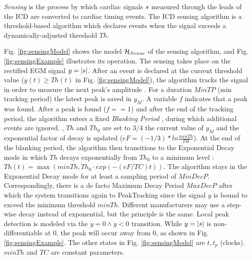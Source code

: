 \emph{Sensing} is the process by which cardiac signals $s$ measured through the leads of the \ac{ICD} are converted to cardiac timing events.
The \ac{ICD} sensing algorithm is a threshold-based algorithm which declares events when the signal exceeds a dynamically-adjusted threshold $Th$.

Fig. \ref{fig:sensingModel} shows the model $\mathcal{H}_{Sense}$ of the sensing algorithm, and Fig. \ref{fig:sensingExample} illustrates its operation. 
The sensing takes place on the rectified \ac{EGM} signal $y = |s|$.
After an event is declared at the current threshold value ($y(t)\geq Th(t)$ in Fig. \ref{fig:sensingModel}), the algorithm tracks the signal in order to measure the next peak's amplitude .
For a duration $MinTP$ (min tracking period) the latest peak is saved in $y_M$.
A variable $f$ indicates that a peak was found.
After a peak is found ($f==1$) and after the end of the tracking period, the algorithm enters a fixed \emph{Blanking Period} , during which additional events are ignored.
, $Th$ and $Th_0$ are set to 3/4 the current value of $y_{M}$ and the exponential factor of decay is updated ($eF=(-1/3)*ln{\frac{minTh}{TH}}$). 
At the end of the blanking period, the algorithm then transitions to the Exponential Decay mode in which $Th$ decays exponentially from $Th_0$ to a minimum level :
$Th(t) = \max(minTh, Th_0\cdot exp(-(eF/TC)t)) $.
The algorithm stays in the Exponential Decay mode for at least a sampling period of $MinDecP$.
Correspondingly, there is a de facto Maximum Decay Period $MaxDecP$ after which the system transitions again to PeakTracking since the signal $y$ is bound to exceed the minimum threshold $minTh$.
Different manufacturers may use a step-wise decay instead of exponential, but the principle is the same.
%
Local peak detection is modeled via the $\dot{y} = 0 \wedge \ddot{y}<0$ transition.
While $y=|s|$ is non-differentiable at 0, the peak will occur away from 0, as shown in Fig. \ref{fig:sensingExample}.
The other states in Fig. \ref{fig:sensingModel} are $t, t_p$ (clocks).
$minTh$ and $TC$ are constant parameters.
